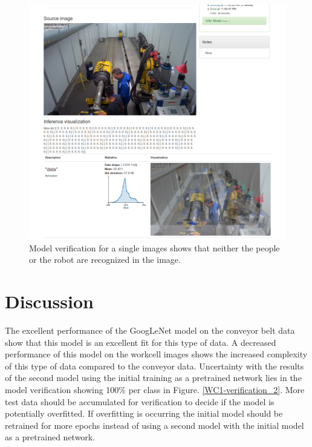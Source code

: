 \documentclass[10pt,journal,compsoc]{IEEEtran}
\begin{document}
\begin{figure}[thpb]
  \centering
  \includegraphics[width=\linewidth]{../img/Workcell2-Object-Detection/model/Workcell2-detectNet-ModelVerification01.png}
  \caption{Model verification for a single images shows that neither the people or the robot are recognized in the image.}
  \label{WC2-model-verif}
\end{figure}


\section{Discussion}
\label{sec:discussion}

The excellent performance of the GoogLeNet model on the conveyor belt data show that this model is an excellent fit for this type of data. A decreased performance of this model on the workcell images shows the increased complexity of this type of data compared to the conveyor data. Uncertainty with the results of the second model using the initial training as a pretrained network lies in the model verification showing 100\% per class in Figure. \ref{WC1-verification_2}. More test data should be accumulated for verification to decide if the model is potentially overfitted. If overfitting is occurring the initial model should be retrained for more epochs instead of using a second model with the initial model as a pretrained network.
\end{document}
